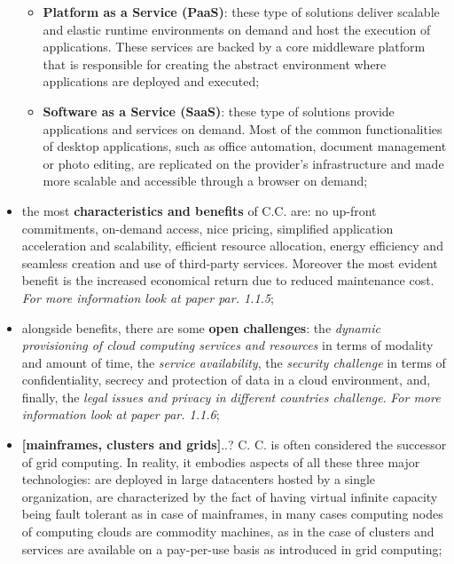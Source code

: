 \documentclass[oneside]{article}
\begin{document}
\begin{itemize}
\begin{itemize}
        \item \textbf{Platform as a Service (PaaS)}: these type of solutions deliver scalable and elastic runtime environments on demand and host the execution of applications. These services are backed by a core middleware platform that is responsible for creating the abstract environment where applications are deployed and executed;
        
        \item \textbf{Software as a Service (SaaS)}: these type of solutions provide applications and services on demand. Most of the common functionalities of desktop applications, such as office automation, document management or photo editing, are replicated on the provider's infrastructure and made more scalable and accessible through a browser on demand;
    \end{itemize}
    
    \item the most \textbf {characteristics and benefits} of C.C. are: no up-front commitments, on-demand access, nice pricing, simplified application acceleration and scalability, efficient resource allocation, energy efficiency and seamless creation and use of third-party services. Moreover the most evident benefit is the increased economical return due to reduced maintenance cost. \textit{For more information look at paper par. 1.1.5};
    
    \item alongside benefits, there are some \textbf{open challenges}: the \textit{dynamic provisioning of cloud computing services and resources} in terms of modality and amount of time, the \textit{service availability}, the \textit{security challenge} in terms of confidentiality, secrecy and protection of data in a cloud environment, and, finally, the \textit{legal issues and privacy in different countries challenge}. \textit{For more information look at paper par. 1.1.6};
    
    \item \textbf{[mainframes, clusters and grids]}..? C. C. is often considered the successor of grid computing. In reality, it embodies aspects of all these three major technologies: are deployed in large datacenters hosted by a single organization, are characterized by the fact of having virtual infinite capacity being fault tolerant as in case of mainframes, in many cases computing nodes of computing clouds are commodity machines, as in the case of clusters and services are available on a pay-per-use basis as introduced in grid computing;
    

\end{itemize}
\end{document}
